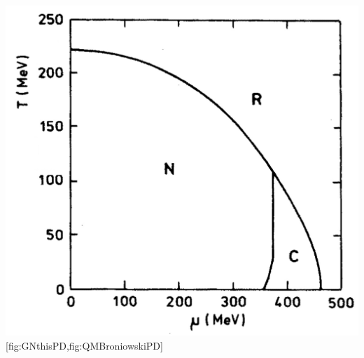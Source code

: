 	{\hspace{.3cm}\includegraphics[width=\subcaptionFigureWidth-0.55cm]{inhomo/figures/Acta Phys.Polon.B.22.145Fig8u.png}} %
	[fig:GNthisPD,fig:QMBroniowskiPD]
